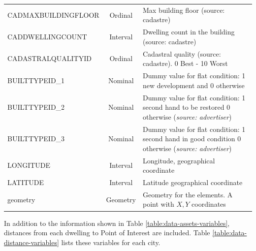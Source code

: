 \documentclass[times,final]{elsarticle}
\begin{document}
\begin{footnotesize}
\begin{longtable}{p{40mm} c p{63mm}}
CADMAXBUILDINGFLOOR & Ordinal & Max building floor (source: cadastre)\\
CADDWELLINGCOUNT & Interval & Dwelling count in the building (source: cadastre)\\
CADASTRALQUALITYID & Ordinal & Cadastral quality (source: cadastre). 0 Best - 10 Worst\\
BUILTTYPEID\_1 & Nominal & Dummy value for flat condition: 1 new development and 0 otherwise\\
BUILTTYPEID\_2 & Nominal & Dummy value for flat condition: 1 second hand to be restored 0 otherwise (\emph{source: advertiser})\\
BUILTTYPEID\_3 & Nominal & Dummy value for flat condition: 1 second hand in good condition 0 otherwise (\emph{source: advertiser})\\
LONGITUDE & Interval & Longitude, geographical coordinate\\
LATITUDE & Interval & Latitude geographical coordinate\\
geometry & Geometry & Geometry for the elements. A point with $X,Y$ coordinates\\
\hline
\hline
\end{longtable}
\end{footnotesize}

In addition to the information shown in Table \ref{table:data-assets-variables}, distances from each dwelling to Point of Interest are included. Table \ref{table:data-distance-variables} lists these variables for each city.
\end{document}
